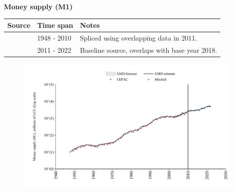 \documentclass[12pt,a4paper,landscape]{article}
\begin{document}
\begin{adjustbox}{max totalsize={\paperwidth}{\paperheight},center}
\begin{minipage}[t][\textheight][t]{\textwidth}
\vspace*{0.5cm}
{}
\begin{center}
{\Large\bfseries Money supply (M1)}
\end{center}
\vspace{0.5cm}
\begin{table}[H]
\centering
\small
\begin{tabular}{|l|l|l|}
\hline
\textbf{Source} & \textbf{Time span} & \textbf{Notes} \\
\hline
\rowcolor{white}\cite{Mitchell}& 1948 - 2010 &Spliced using overlapping data in 2011. \\
\rowcolor{lightgray}\cite{CEPAC}& 2011 - 2022 &Baseline source, overlaps with base year 2018. \\
\hline
\end{tabular}
\end{table}
\begin{figure}[H]
\centering
\includegraphics[width=\textwidth,height=0.6\textheight,keepaspectratio]{graphs/SLV_M1.pdf}
\end{figure}
\end{minipage}
\end{adjustbox}
\end{document}
